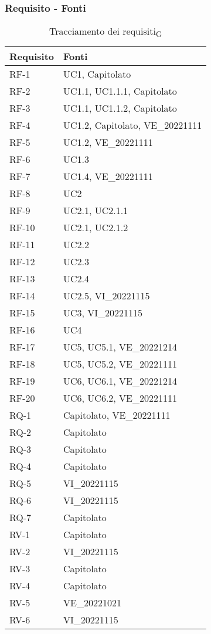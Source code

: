 \subsubsection{Requisito - Fonti}
\begin{table}[H]
	\centering
	\begin{tabular}{| p{} | p{} |} 
		\hline
		\textbf{Requisito} & \textbf{Fonti} \\
		\hline
		RF-1 & UC1, Capitolato\\
		\hline
		RF-2 & UC1.1, UC1.1.1, Capitolato\\
		\hline
		RF-3 & UC1.1, UC1.1.2, Capitolato\\
		\hline
		RF-4 & UC1.2, Capitolato, VE\_20221111\\
		\hline
		RF-5 & UC1.2, VE\_20221111\\
		\hline
		RF-6 & UC1.3\\
		\hline
		RF-7 & UC1.4, VE\_20221111\\
		\hline
		RF-8 & UC2\\
        \hline
		RF-9 & UC2.1, UC2.1.1\\
        \hline
		RF-10 & UC2.1, UC2.1.2\\
        \hline
		RF-11 & UC2.2\\
        \hline
		RF-12 & UC2.3\\
        \hline
		RF-13 & UC2.4\\
		\hline
		RF-14 & UC2.5, VI\_20221115\\
         \hline
		RF-15 & UC3, VI\_20221115\\
        \hline
		RF-16 & UC4\\
         \hline
		RF-17 & UC5, UC5.1, VE\_20221214\\
        \hline
		RF-18 & UC5, UC5.2, VE\_20221111\\
         \hline
		RF-19 & UC6, UC6.1, VE\_20221214\\
         \hline
		RF-20 & UC6, UC6.2, VE\_20221111\\
		\hline
		RQ-1 & Capitolato, VE\_20221111\\
		\hline
		RQ-2 & Capitolato\\
		\hline
		RQ-3 & Capitolato\\
		\hline
		RQ-4 & Capitolato\\
		\hline
		RQ-5 & VI\_20221115\\
		\hline
		RQ-6 & VI\_20221115\\
		\hline
		RQ-7 & Capitolato\\
		\hline
		RV-1 & Capitolato\\
		\hline
		RV-2 & VI\_20221115\\
		\hline
		RV-3 & Capitolato\\
		\hline
		RV-4 & Capitolato\\
		\hline
		RV-5 & VE\_20221021\\
		\hline
		RV-6 & VI\_20221115\\
		\hline
	\end{tabular}
	\caption{Tracciamento dei requisiti\textsubscript{G}}
\end{table}

